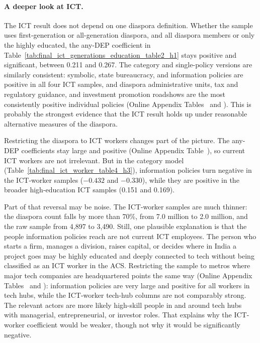 \documentclass[12pt]{article}
\begin{document}


\paragraph{A deeper look at ICT.} The ICT result does not depend on one diaspora definition. Whether the sample uses first-generation or all-generation diaspora, and all diaspora members or only the highly educated, the any-DEP coefficient in Table~\ref{tab:final_ict_generations_education_table2_h1} stays positive and significant, between 0.211 and 0.267. The category and single-policy versions are similarly consistent: symbolic, state bureaucracy, and information policies are positive in all four ICT samples, and diaspora administrative units, tax and regulatory guidance, and investment promotion roadshows are the most consistently positive individual policies (Online Appendix Tables~ and ). This is probably the strongest evidence that the ICT result holds up under reasonable alternative measures of the diaspora.



Restricting the diaspora to ICT workers changes part of the picture. The any-DEP coefficients stay large and positive (Online Appendix Table~), so current ICT workers are not irrelevant. But in the category model (Table~\ref{tab:final_ict_worker_table4_h3}), information policies turn negative in the ICT-worker samples ($-0.432$ and $-0.330$), while they are positive in the broader high-education ICT samples (0.151 and 0.169).



Part of that reversal may be noise. The ICT-worker samples are much thinner: the diaspora count falls by more than 70\%, from 7.0 million to 2.0 million, and the raw sample from 4,897 to 3,490. Still, one plausible explanation is that the people information policies reach are not current ICT employees. The person who starts a firm, manages a division, raises capital, or decides where in India a project goes may be highly educated and deeply connected to tech without being classified as an ICT worker in the ACS. Restricting the sample to metros where major tech companies are headquartered points the same way (Online Appendix Tables~ and ): information policies are very large and positive for all workers in tech hubs, while the ICT-worker tech-hub columns are not comparably strong. The relevant actors are more likely high-skill people in and around tech hubs with managerial, entrepreneurial, or investor roles. That explains why the ICT-worker coefficient would be weaker, though not why it would be significantly negative.
\end{document}

